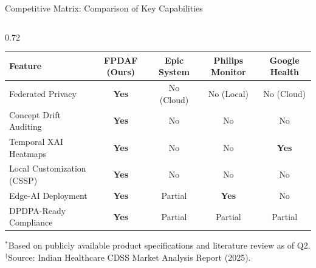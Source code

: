 \documentclass[aspectratio=169, 11pt]{beamer}
\begin{document}
\begin{frame}{Competitive Matrix: Comparison of Key Capabilities}
    \begin{columns}[c]
        \begin{column}{0.72\textwidth}
            \scriptsize
            \setlength{\tabcolsep}{1.5pt}
            \renewcommand{\arraystretch}{1.3}
            \begin{tabular}{l c c c c}
            \hline
            \rowcolor{lightCyanBg}
            \textbf{\textcolor{neonCyan}{Feature}} & \textbf{\textcolor{neonCyan}{FPDAF (Ours)}} & \textbf{\textcolor{neonCyan}{Epic System}} & \textbf{\textcolor{neonCyan}{Philips Monitor}} & \textbf{\textcolor{neonCyan}{Google Health}} \\
            \hline
            Federated Privacy & \textbf{\textcolor{neonTeal}{Yes}} & \textcolor{neonRose}{No (Cloud)} & \textcolor{neonRose}{No (Local)} & \textcolor{neonRose}{No (Cloud)} \\
            Concept Drift Auditing & \textbf{\textcolor{neonTeal}{Yes}} & \textcolor{neonRose}{No} & \textcolor{neonRose}{No} & \textcolor{neonRose}{No} \\
            Temporal XAI Heatmaps & \textbf{\textcolor{neonTeal}{Yes}} & \textcolor{neonRose}{No} & \textcolor{neonRose}{No} & \textbf{\textcolor{neonTeal}{Yes}} \\
            Local Customization (CSSP) & \textbf{\textcolor{neonTeal}{Yes}} & \textcolor{neonRose}{No} & \textcolor{neonRose}{No} & \textcolor{neonRose}{No} \\
            Edge-AI Deployment & \textbf{\textcolor{neonTeal}{Yes}} & \textcolor{neonAmber}{Partial} & \textbf{\textcolor{neonTeal}{Yes}} & \textcolor{neonRose}{No} \\
            DPDPA-Ready Compliance & \textbf{\textcolor{neonTeal}{Yes}} & \textcolor{neonAmber}{Partial} & \textcolor{neonAmber}{Partial} & \textcolor{neonAmber}{Partial} \\
            \hline
            \end{tabular}
            \vspace{0.2cm}
            \tiny \textcolor{mutedText}{$^*$Based on publicly available product specifications and literature review as of Q2.}\\
            \textcolor{mutedText}{$^\dagger$Source: Indian Healthcare CDSS Market Analysis Report (2025).}
        \end{column}
        

\end{columns}
\end{frame}
\end{document}
